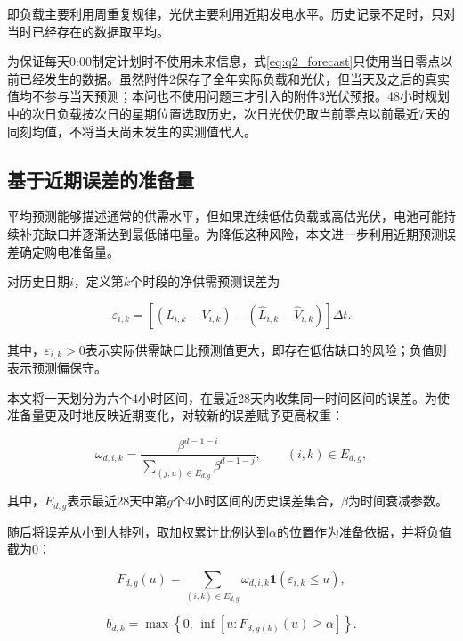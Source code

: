 即负载主要利用周重复规律，光伏主要利用近期发电水平。历史记录不足时，只对当时已经存在的数据取平均。

为保证每天0:00制定计划时不使用未来信息，式\eqref{eq:q2_forecast}只使用当日零点以前已经发生的数据。虽然附件2保存了全年实际负载和光伏，但当天及之后的真实值均不参与当天预测；本问也不使用问题三才引入的附件3光伏预报。48小时规划中的次日负载按次日的星期位置选取历史，次日光伏仍取当前零点以前最近7天的同刻均值，不将当天尚未发生的实测值代入。


\subsection{基于近期误差的准备量}

平均预测能够描述通常的供需水平，但如果连续低估负载或高估光伏，电池可能持续补充缺口并逐渐达到最低储电量。为降低这种风险，本文进一步利用近期预测误差确定购电准备量。

对历史日期$i$，定义第$k$个时段的净供需预测误差为

\begin{equation}
\varepsilon_{i,k}
=
\left[
(L_{i,k}-V_{i,k})
-
(\widehat L_{i,k}-\widehat V_{i,k})
\right]\Delta t .
\label{eq:q2_error}
\end{equation}

其中，$\varepsilon_{i,k}>0$表示实际供需缺口比预测值更大，即存在低估缺口的风险；负值则表示预测偏保守。

本文将一天划分为六个4小时区间，在最近28天内收集同一时间区间的误差。为使准备量更及时地反映近期变化，对较新的误差赋予更高权重：

\begin{equation}
\omega_{d,i,k}
=
\frac{\beta^{d-1-i}}
{\displaystyle
\sum_{(j,u)\in E_{d,g}}
\beta^{d-1-j}},
\qquad
(i,k)\in E_{d,g},
\label{eq:q2_weight}
\end{equation}

其中，$E_{d,g}$表示最近28天中第$g$个4小时区间的历史误差集合，$\beta$为时间衰减参数。

随后将误差从小到大排列，取加权累计比例达到$\alpha$的位置作为准备依据，并将负值截为0：

\begin{equation}
F_{d,g}(u)
=
\sum_{(i,k)\in E_{d,g}}
\omega_{d,i,k}
\mathbf{1}
\left(
\varepsilon_{i,k}\leq u
\right),
\label{eq:q2_cdf}
\end{equation}

\begin{equation}
b_{d,k}
=
\max
\left\{
0,\,
\inf
\left[
u:F_{d,g(k)}(u)\geq\alpha
\right]
\right\}.
\label{eq:q2_reserve}
\end{equation}

